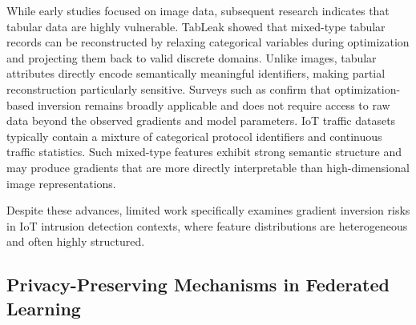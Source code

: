 \documentclass[journal,twoside,web]{ieeecolor}
\begin{document}
While early studies focused on image data, subsequent research indicates that tabular data are highly vulnerable. TabLeak \cite{vero2023tableak} showed that mixed-type tabular records can be reconstructed by relaxing categorical variables during optimization and projecting them back to valid discrete domains. Unlike images, tabular attributes directly encode semantically meaningful identifiers, making partial reconstruction particularly sensitive. Surveys such as \cite{zhang2022surveyGI} confirm that optimization-based inversion remains broadly applicable and does not require access to raw data beyond the observed gradients and model parameters.
IoT traffic datasets typically contain a mixture of categorical protocol identifiers and continuous traffic statistics. Such mixed-type features exhibit strong semantic structure and may produce gradients that are more directly interpretable than high-dimensional image representations.

Despite these advances, limited work specifically examines gradient inversion risks in IoT intrusion detection contexts, where feature distributions are heterogeneous and often highly structured.

\subsection{Privacy-Preserving Mechanisms in Federated Learning}
\end{document}
